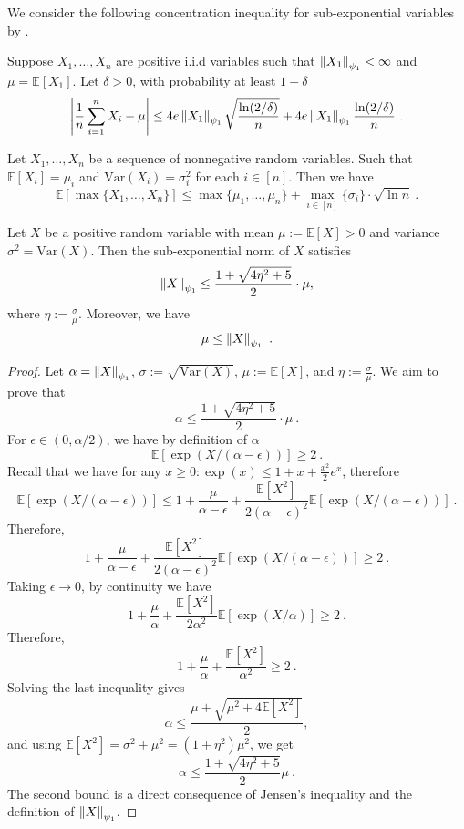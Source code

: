 We consider the following concentration inequality for sub-exponential variables by \citet{maurer2021concentration}.

\begin{proposition}\label{prop:concentration}
	Suppose $X_1, \dots, X_n$ are positive i.i.d variables such that $\left\| X_1 \right\|_{\psi_1} < \infty$ and $\mu = \mathbb{E}[X_1]$. Let $\delta >0$, with probability at least $1-\delta$
	$$
	\left| \frac{1}{n}\sum_{i=1}^{n}X_i - \mu \right| \le 4e\left\| X_1 \right\|_{\psi_1} \sqrt{\frac{\ln(2/\delta)}{n}}+4e\left\| X_1 \right\|_{\psi_1} \frac{\ln(2/\delta)}{n}~.
	$$ 
\end{proposition}


\begin{lemma}
	Let $X_1, \dots, X_n$ be a sequence of nonnegative  random variables. Such that $\mathbb{E}[X_i]=\mu_i$ and $\text{Var}(X_i) = \sigma_i^2$ for each $i \in [n]$. Then we have
	$$
	\mathbb{E}[\max\{X_1, \dots, X_n\}] \le \max\{\mu_1, \dots, \mu_n\}+\max_{i\in [n]} \{\sigma_i \}\cdot \sqrt{\ln n}~.
	$$  
\end{lemma}


\begin{lemma}\label{lem:tech1}
	Let $X$ be a positive random variable with mean $\mu := \mathbb{E}[X]>0$ and variance $\sigma^2 = \text{Var}(X)$. Then the sub-exponential norm of $X$ satisfies
	$$
	\left\| X \right\|_{\psi_1} \le \frac{1+\sqrt{4\eta^2+5}}{2}\cdot \mu,
	$$
	where $\eta := \frac{\sigma}{\mu}$.
	Moreover, we have
	$$
	\mu \le \left\| X \right\|_{\psi_1}~.
	$$
\end{lemma}
%
\begin{proof}
	Let $\alpha = \left\| X \right\|_{\psi_1}$, $\sigma := \sqrt{\text{Var}(X)}$, $\mu := \mathbb{E}[X]$, and $\eta := \frac{\sigma}{\mu}$. We aim to prove that
	$$
	\alpha \le \frac{1+\sqrt{4\eta^2+5}}{2}\cdot \mu~.
	$$
	For $\epsilon \in (0, \alpha/2)$, we have by definition of $\alpha$
	$$
	\mathbb{E}[\exp(X/(\alpha-\epsilon))] \ge 2~.
	$$
	Recall that we have for any $x\ge 0: \exp(x) \le 1+x+\frac{x^2}{2}e^{x}$, therefore
	$$
	\mathbb{E}\left[\exp(X/(\alpha-\epsilon)) \right] \le 1+ \frac{\mu}{\alpha-\epsilon}+ \frac{\mathbb{E}[X^2]}{2(\alpha-\epsilon)^2} \mathbb{E}[\exp(X/(\alpha-\epsilon))]~.
	$$
	Therefore,
	$$
	1+ \frac{\mu}{\alpha-\epsilon}+ \frac{\mathbb{E}[X^2]}{2(\alpha-\epsilon)^2} \mathbb{E}[\exp(X/(\alpha-\epsilon))] \ge 2~.
	$$
	Taking $\epsilon \to 0$, by continuity we have
	$$
	1+ \frac{\mu}{\alpha}+ \frac{\mathbb{E}[X^2]}{2\alpha^2} \mathbb{E}[\exp(X/\alpha)] \ge 2~.
	$$
	Therefore,
	$$
	1+ \frac{\mu}{\alpha}+ \frac{\mathbb{E}[X^2]}{\alpha^2} \ge 2~.
	$$
	Solving the last inequality gives
	$$
	\alpha \le \frac{\mu + \sqrt{\mu^2+4\mathbb{E}[X^2]}}{2},
	$$
	and using $\mathbb{E}[X^2] = \sigma^2+\mu^2 = (1+\eta^2)\mu^2$, we get
	$$
	\alpha \le \frac{1+\sqrt{4\eta^2+5}}{2}\mu~.
	$$
	The second bound is a direct consequence of Jensen's inequality and the definition of $\left\| X \right\|_{\psi_1}$.
\end{proof}


